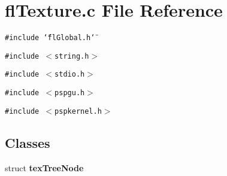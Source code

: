 \section{fl\-Texture.c File Reference}
\label{flTexture_8c}
{\tt \#include \char`\"{}fl\-Global.h\char`\"{}}\par
{\tt \#include $<$string.h$>$}\par
{\tt \#include $<$stdio.h$>$}\par
{\tt \#include $<$pspgu.h$>$}\par
{\tt \#include $<$pspkernel.h$>$}\par
\subsection*{Classes}
\begin{CompactItemize}
\item 
struct {\bf tex\-Tree\-Node}
\end{CompactItemize}
